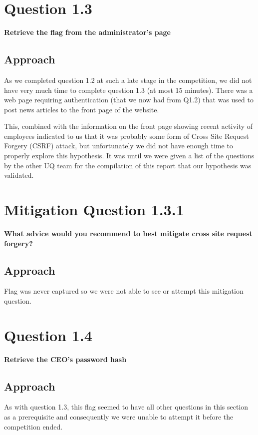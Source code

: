 \section{Question 1.3}
\textbf{Retrieve the flag from the administrator's page}
\subsection{Approach}
As we completed question 1.2 at such a late stage in the competition, we did not
have very much time to complete question 1.3 (at most 15 minutes). There was a
web page requiring authentication (that we now had from Q1.2) that was used to
post news articles to the front page of the website.

This, combined with the information on the front page showing recent activity of
employees indicated to us that it was probably some form of Cross Site Request
Forgery (CSRF) attack, but unfortunately we did not have enough time to properly
explore this hypothesis. It was until we were given a list of the questions by
the other UQ team for the compilation of this report that our hypothesis was
validated.

\section{Mitigation Question 1.3.1}
\textbf{What advice would you recommend to best mitigate cross site request
forgery?}
\subsection{Approach}
Flag was never captured so we were not able to see or attempt this mitigation
question.

\section{Question 1.4}
\textbf{Retrieve the CEO's password hash}
\subsection{Approach}
As with question 1.3, this flag seemed to have all other questions in this
section as a prerequisite and consequently we were unable to attempt it before
the competition ended.
